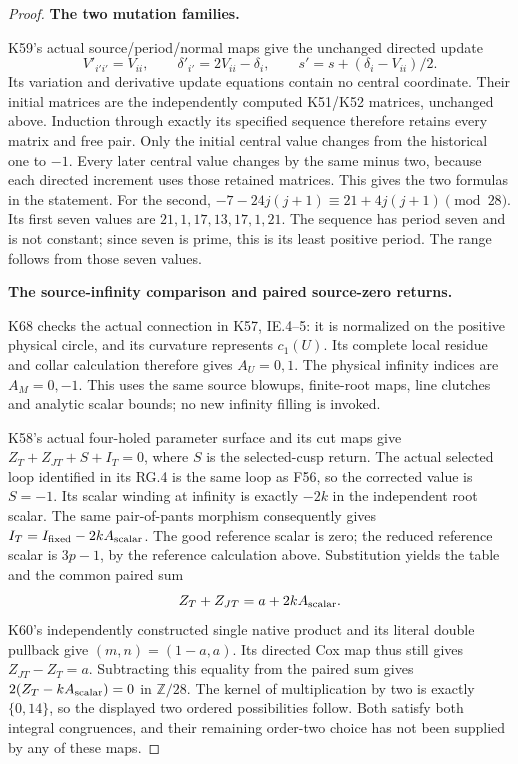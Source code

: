 \begin{proof}
\par\medskip\noindent\textbf{The two mutation families.}\par\nobreak
K59's actual source/period/normal maps give the unchanged directed
update
\[
 V'_{i'i'}=V_{ii},\qquad
 \delta'_{i'}=2V_{ii}-\delta_i,\qquad
 s'=s+(\delta_i-V_{ii})/2.
\]
Its variation and derivative update equations contain no central
coordinate. Their initial matrices are the independently computed
K51/K52 matrices, unchanged above. Induction through exactly its
specified sequence therefore retains every matrix and free pair.
Only the initial central value changes from the historical one to
\(-1\). Every later central value changes by the same minus two,
because each directed increment uses those retained matrices.
This gives the two formulas in the statement. For the second,
\(-7-24j(j+1)\equiv21+4j(j+1)\pmod{28}\). Its first seven
values are \(21,1,17,13,17,1,21\). The sequence has period seven
and is not constant; since seven is prime, this is its least positive
period. The range follows from those seven values.

\par\medskip\noindent\textbf{The source-infinity comparison and paired source-zero returns.}\par\nobreak
K68 checks the actual connection in K57, IE.4--5: it is normalized
on the positive physical circle, and its curvature represents
\(c_1(U)\). Its complete local residue and collar calculation
therefore gives \(A_U=0,1\). The physical infinity indices are
\(A_M=0,-1\). This uses the same source blowups, finite-root maps,
line clutches and analytic scalar bounds; no new infinity filling
is invoked.

K58's actual four-holed parameter surface and its cut maps give
\(Z_T+Z_{JT}+S+I_T=0\), where \(S\) is the selected-cusp return.
The actual selected loop identified in its RG.4 is the same loop as
F56, so the corrected value is \(S=-1\). Its scalar winding at
infinity is exactly \(-2k\) in the independent root scalar.
The same pair-of-pants morphism consequently gives
\(I_T=I_{\rm fixed}-2kA_{\rm scalar}\).
The good reference scalar is zero; the reduced reference scalar is
\(3p-1\), by the reference calculation above. Substitution yields
the table and the common paired sum
\[
                    Z_T+Z_{JT}=a+2kA_{\rm scalar}.
\]
K60's independently constructed single native product and its literal
double pullback give \((m,n)=(1-a,a)\). Its directed Cox map thus
still gives \(Z_{JT}-Z_T=a\). Subtracting this equality from the
paired sum gives
\(2(Z_T-kA_{\rm scalar})=0\) in \(\mathbb Z/28\).
The kernel of multiplication by two is exactly \(\{0,14\}\), so
the displayed two ordered possibilities follow. Both satisfy both
integral congruences, and their remaining order-two choice has not
been supplied by any of these maps.


\end{proof}
